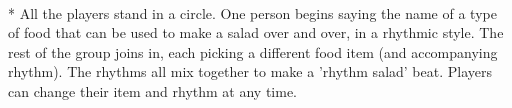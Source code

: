 \begin{minipage}{\textwidth}
\\*
All the players stand in a circle.  One person begins saying the name of a type of food that can be used to make a salad over and over, in a rhythmic style.  The rest of the group joins in, each picking a different food item (and accompanying rhythm).  The rhythms all mix together to make a 'rhythm salad' beat.  Players can change their item and rhythm at any time.
\end{minipage}    \vfill
